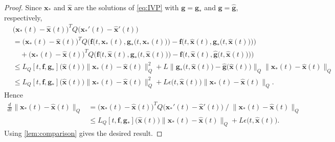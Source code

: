 \documentclass[10pt,a4paper]{amsart}
\newcommand{\bff}{\ensuremath{\mathbf{f}}} %
\newcommand{\bg}{\ensuremath{\mathbf{g}}} %
\newcommand{\bx}{\ensuremath{\mathbf{x}}} %
\begin{document}
\begin{proof}
    Since $\bx_*$ and $\widehat{\bx}$ are the solutions of \cref{eq:IVP} with $\bg = \bg_*$ and $\bg = \widehat{\bg}$,
    respectively,
    \begin{align*}
       & \Big( \bx_*(t) - \widehat{\bx}(t) \Big)^T Q  \Big(  \bx_*'(t) - \widehat{\bx}'(t) \Big)  \\
         &=  \Big( \bx_*(t) - \widehat{\bx}(t) \Big)^T Q
               \Bigg( \bff\Big( t, \bx_*(t), \bg_*\big( t, \bx_*(t) \big) \Big) -  \bff\Big( t, \widehat{\bx}(t), \bg_*\big( t, \widehat{\bx}(t) \big) \Big) \Bigg)  \\
            & \quad  + \Big( \bx_*(t) - \widehat{\bx}(t) \Big)^T Q
                   \Bigg( \bff\Big( t, \widehat{\bx}(t), \bg_*\big( t, \widehat{\bx}(t) \big) \Big) -  \bff\Big( t, \widehat{\bx}(t), \widehat{\bg}\big(t, \widehat{\bx}(t) \big) \Big) \Bigg) \\
       &\le  L_Q[t, \bff,\bg_*]\big(  \widehat{\bx}(t) \big)  \big\| \bx_*(t) - \widehat{\bx}(t) \big\|_Q^2 
                 + L   \Big\| \bg_*\big( t, \widehat{\bx}(t) \big)  -  \widehat{\bg}\big(\widehat{\bx}(t) \big) \Big\|_Q \big\| \bx_*(t) - \widehat{\bx}(t) \big\|_Q \\
      &\le  L_Q[t, \bff,\bg_*]\big(  \widehat{\bx}(t) \big)  \big\| \bx_*(t) - \widehat{\bx}(t) \big\|_Q^2 
                 + L    \epsilon\big( t, \widehat{\bx}(t) \big)  \big\| \bx_*(t) - \widehat{\bx}(t) \big\|_Q.
    \end{align*}
    Hence
    \begin{align*}           
         \frac{d}{dt}  \big\| \bx_*(t) - \widehat{\bx}(t) \big\|_Q
        &= \Big( \bx_*(t) - \widehat{\bx}(t) \Big)^T Q  \Big(  \bx_*'(t) - \widehat{\bx}'(t) \Big)   \; \big/ \; \big\| \bx_*(t) - \widehat{\bx}(t) \big\|_Q \\
        &\le L_Q[t,\bff,\bg_*]\big(  \widehat{\bx}(t) \big)  \big\| \bx_*(t) - \widehat{\bx}(t) \big\|_Q
                 + L    \epsilon\big( t, \widehat{\bx}(t) \big). 
    \end{align*}
    Using \cref{lem:comparison} gives the desired result. 
 \end{proof}
\end{document}
